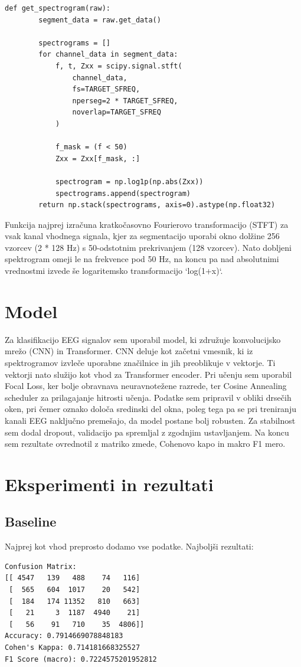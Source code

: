 \begin{verbatim}
def get_spectrogram(raw):
        segment_data = raw.get_data()

        spectrograms = []
        for channel_data in segment_data:
            f, t, Zxx = scipy.signal.stft(
                channel_data,
                fs=TARGET_SFREQ,
                nperseg=2 * TARGET_SFREQ,
                noverlap=TARGET_SFREQ
            )
            
            f_mask = (f < 50)
            Zxx = Zxx[f_mask, :]

            spectrogram = np.log1p(np.abs(Zxx))
            spectrograms.append(spectrogram)
        return np.stack(spectrograms, axis=0).astype(np.float32)
\end{verbatim}

    
Funkcija najprej izračuna kratkočasovno Fourierovo transformacijo 
(STFT) za vsak kanal vhodnega signala, kjer za segmentacijo uporabi 
okno dolžine 256 vzorcev (2 * 128 Hz) s 50-odstotnim prekrivanjem 
(128 vzorcev). Nato dobljeni spektrogram omeji le na frekvence pod 
50 Hz, na koncu pa nad absolutnimi vrednostmi izvede še 
logaritemsko transformacijo `log(1+x)`.


\section{Model}
Za klasifikacijo EEG signalov sem uporabil model, 
ki združuje konvolucijsko mrežo (CNN) in Transformer.
CNN deluje kot začetni vmesnik, ki iz spektrogramov
izvleče uporabne značilnice in jih preoblikuje v vektorje.
Ti vektorji nato služijo kot vhod za Transformer encoder.
Pri učenju sem uporabil Focal Loss, ker bolje obravnava 
neuravnotežene razrede, ter Cosine Annealing 
scheduler za prilagajanje hitrosti učenja. 
Podatke sem pripravil v obliki drsečih oken, 
pri čemer oznako določa sredinski del okna, 
poleg tega pa se pri treniranju kanali EEG naključno
premešajo, da model postane bolj robusten. Za stabilnost
sem dodal dropout, validacijo pa spremljal z zgodnjim
ustavljanjem. Na koncu sem rezultate ovrednotil z matriko zmede,
Cohenovo kapo in makro F1 mero.

\section{Eksperimenti in rezultati}
\subsection{Baseline}
Najprej kot vhod preprosto dodamo vse podatke.
Najboljši rezultati:
\begin{verbatim}
Confusion Matrix:
[[ 4547   139   488    74   116]
 [  565   604  1017    20   542]
 [  184   174 11352   810   663]
 [   21     3  1187  4940    21]
 [   56    91   710    35  4806]]
Accuracy: 0.7914669078848183
Cohen's Kappa: 0.714181668325527
F1 Score (macro): 0.7224575201952812
\end{verbatim}

